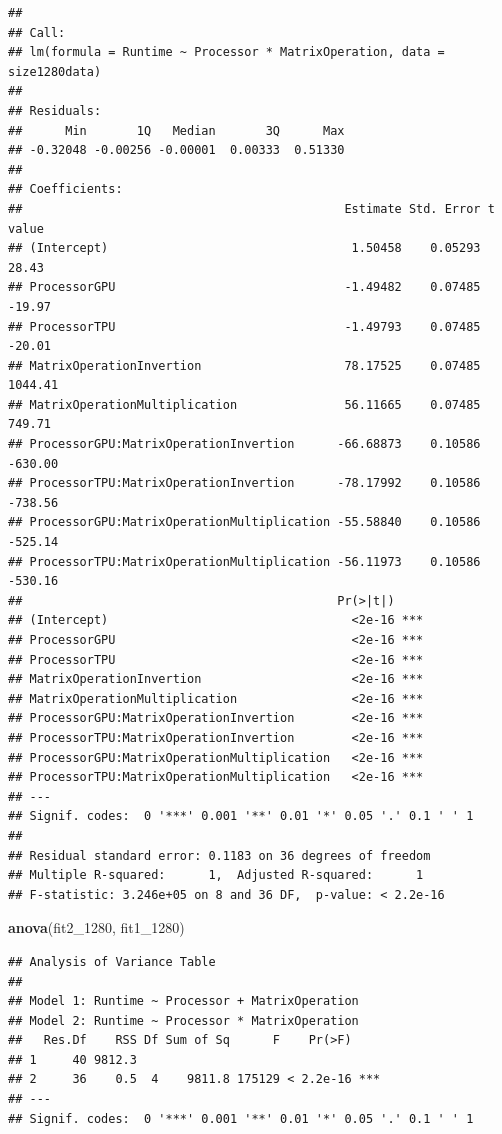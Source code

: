\documentclass[
]{article}
\newenvironment{Shaded}{\begin{snugshade}}{\end{snugshade}}
\newcommand{\DecValTok}[1]{\textcolor[rgb]{0.00,0.00,0.81}{#1}}
\newcommand{\KeywordTok}[1]{\textcolor[rgb]{0.13,0.29,0.53}{\textbf{#1}}}
\newcommand{\NormalTok}[1]{#1}
\begin{document}
\begin{verbatim}
## 
## Call:
## lm(formula = Runtime ~ Processor * MatrixOperation, data = size1280data)
## 
## Residuals:
##      Min       1Q   Median       3Q      Max 
## -0.32048 -0.00256 -0.00001  0.00333  0.51330 
## 
## Coefficients:
##                                             Estimate Std. Error t value
## (Intercept)                                  1.50458    0.05293   28.43
## ProcessorGPU                                -1.49482    0.07485  -19.97
## ProcessorTPU                                -1.49793    0.07485  -20.01
## MatrixOperationInvertion                    78.17525    0.07485 1044.41
## MatrixOperationMultiplication               56.11665    0.07485  749.71
## ProcessorGPU:MatrixOperationInvertion      -66.68873    0.10586 -630.00
## ProcessorTPU:MatrixOperationInvertion      -78.17992    0.10586 -738.56
## ProcessorGPU:MatrixOperationMultiplication -55.58840    0.10586 -525.14
## ProcessorTPU:MatrixOperationMultiplication -56.11973    0.10586 -530.16
##                                            Pr(>|t|)    
## (Intercept)                                  <2e-16 ***
## ProcessorGPU                                 <2e-16 ***
## ProcessorTPU                                 <2e-16 ***
## MatrixOperationInvertion                     <2e-16 ***
## MatrixOperationMultiplication                <2e-16 ***
## ProcessorGPU:MatrixOperationInvertion        <2e-16 ***
## ProcessorTPU:MatrixOperationInvertion        <2e-16 ***
## ProcessorGPU:MatrixOperationMultiplication   <2e-16 ***
## ProcessorTPU:MatrixOperationMultiplication   <2e-16 ***
## ---
## Signif. codes:  0 '***' 0.001 '**' 0.01 '*' 0.05 '.' 0.1 ' ' 1
## 
## Residual standard error: 0.1183 on 36 degrees of freedom
## Multiple R-squared:      1,  Adjusted R-squared:      1 
## F-statistic: 3.246e+05 on 8 and 36 DF,  p-value: < 2.2e-16
\end{verbatim}

\begin{Shaded}
\begin{Highlighting}[]
\KeywordTok{anova}\NormalTok{(fit2\_}\DecValTok{1280}\NormalTok{, fit1\_}\DecValTok{1280}\NormalTok{)}
\end{Highlighting}
\end{Shaded}

\begin{verbatim}
## Analysis of Variance Table
## 
## Model 1: Runtime ~ Processor + MatrixOperation
## Model 2: Runtime ~ Processor * MatrixOperation
##   Res.Df    RSS Df Sum of Sq      F    Pr(>F)    
## 1     40 9812.3                                  
## 2     36    0.5  4    9811.8 175129 < 2.2e-16 ***
## ---
## Signif. codes:  0 '***' 0.001 '**' 0.01 '*' 0.05 '.' 0.1 ' ' 1
\end{verbatim}
\end{document}
